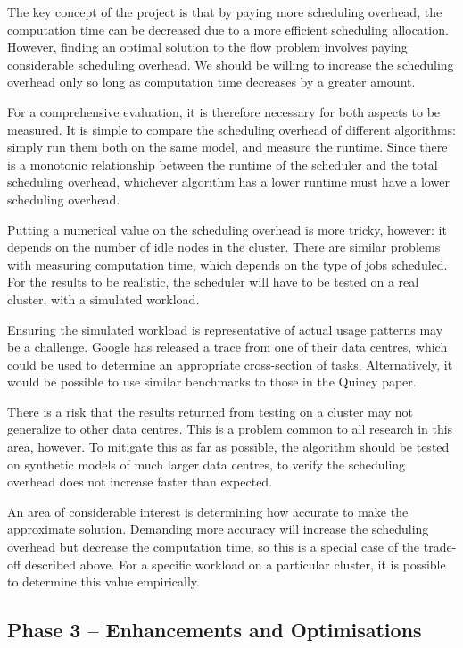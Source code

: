 The key concept of the project is that by paying more scheduling overhead, the computation time can be decreased due to a more efficient scheduling allocation. However, finding an optimal solution to the flow problem involves paying considerable scheduling overhead. We should be willing to increase the scheduling overhead only so long as computation time decreases by a greater amount.

For a comprehensive evaluation, it is therefore necessary for both aspects to be measured. It is simple to compare the scheduling overhead of different algorithms: simply run them both on the same model, and measure the runtime. Since there is a monotonic relationship between the runtime of the scheduler and the total scheduling overhead, whichever algorithm has a lower runtime must have a lower scheduling overhead.

Putting a numerical value on the scheduling overhead is more tricky, however: it depends on the number of idle nodes in the cluster. There are similar problems with measuring computation time, which depends on the type of jobs scheduled. For the results to be realistic, the scheduler will have to be tested on a real cluster, with a simulated workload. 

Ensuring the simulated workload is representative of actual usage patterns may be a challenge. Google has released a trace from one of their data centres\cite{clusterdata:Wilkes2011,clusterdata:Reiss2011}, which could be used to determine an appropriate cross-section of tasks. Alternatively, it would be possible to use similar benchmarks to those in the Quincy paper\cite{Isard:2009}.

There is a risk that the results returned from testing on a cluster may not generalize to other data centres. This is a problem common to all research in this area, however. To mitigate this as far as possible, the algorithm should be tested on synthetic models of much larger data centres, to verify the scheduling overhead does not increase faster than expected.

An area of considerable interest is determining how accurate to make the approximate solution. Demanding more accuracy will increase the scheduling overhead but decrease the computation time, so this is a special case of the trade-off described above. For a specific workload on a particular cluster, it is possible to determine this value empirically.

\subsection*{Phase 3 -- Enhancements and Optimisations}

